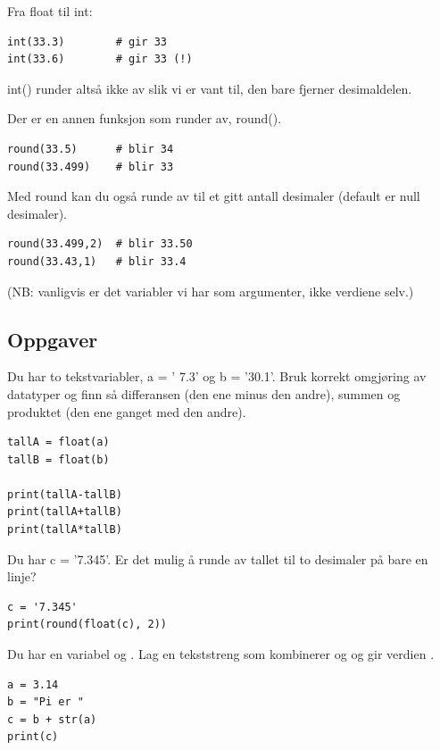 Fra float til int:
\begin{lstlisting}
int(33.3)        # gir 33
int(33.6)        # gir 33 (!)
\end{lstlisting}

int() runder altså ikke av slik vi er vant til, den bare fjerner desimaldelen. 

Der er en annen funksjon som runder av, round().

\begin{lstlisting}
round(33.5)      # blir 34 
round(33.499)    # blir 33
\end{lstlisting}

Med round kan du også runde av til et gitt antall desimaler (default er null desimaler).
\begin{lstlisting}
round(33.499,2)  # blir 33.50
round(33.43,1)   # blir 33.4
\end{lstlisting}

(NB: vanligvis er det variabler vi har som argumenter, ikke verdiene selv.)  

\subsection{Oppgaver}

\begin{exercise}
Du har to tekstvariabler, a = ' 7.3' og b = '30.1'. Bruk korrekt omgjøring av datatyper og finn så differansen (den ene minus den andre), summen og produktet (den ene ganget med den andre).
\end{exercise}
\begin{solution}
\begin{lstlisting}
tallA = float(a)
tallB = float(b)

print(tallA-tallB)
print(tallA+tallB)
print(tallA*tallB)
\end{lstlisting}
\end{solution}

\begin{exercise}
Du har c = '7.345'. Er det mulig å runde av tallet til to desimaler på bare en linje?
\end{exercise}
\begin{solution}
\begin{lstlisting}
c = '7.345'
print(round(float(c), 2))
\end{lstlisting}
\end{solution}

\begin{exercise}
Du har en variabel  og . Lag en tekststreng  som kombinerer  og  og gir verdien .
\end{exercise}
\begin{solution}
\begin{lstlisting}
a = 3.14
b = "Pi er "
c = b + str(a)
print(c)
\end{lstlisting}
\end{solution}

